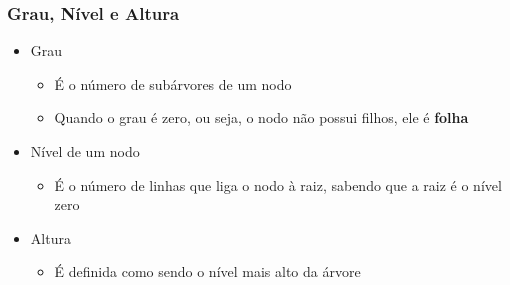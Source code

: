 \documentclass[aspectratio=169]{beamer}
\begin{document}
\begin{frame}\frametitle{Grau, Nível e Altura}
\begin{itemize}
	\item  Grau
	\begin{itemize}
		\item É o número de subárvores de um nodo
		\item Quando o grau é zero, ou seja, o nodo não possui filhos, ele é \textbf{folha}
	\end{itemize}
	\item Nível de um nodo
	\begin{itemize}
		\item É o número de linhas que liga o nodo à raiz, sabendo que a raiz é o nível zero
	\end{itemize}
	\item Altura
	\begin{itemize}
		\item É definida como sendo o nível mais alto da árvore
	\end{itemize}
\end{itemize}
\end{frame}
\end{document}
